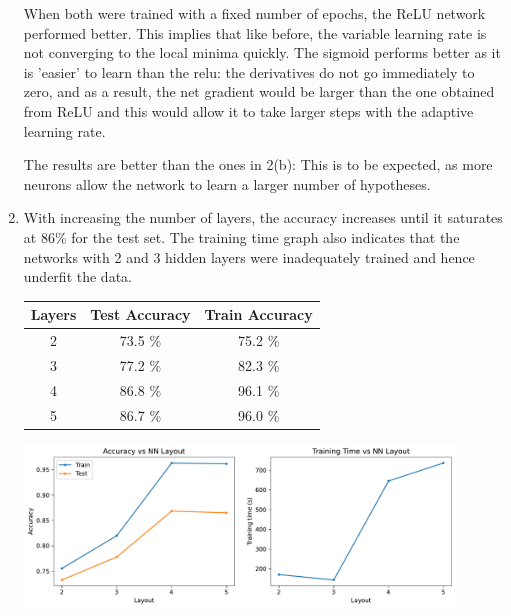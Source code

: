\documentclass[12pt]{article}
\begin{document}
\begin{enumerate}[label=(\alph*)]
    When both were trained with a fixed number of epochs, the ReLU network performed
    better. This implies that like before, the variable learning rate is not 
    converging to the local minima quickly. The sigmoid performs better as it is
    'easier' to learn than the relu: the derivatives do not go immediately to zero,
    and as a result, the net gradient would be larger than the one obtained from
    ReLU and this would allow it to take larger steps with the adaptive learning 
    rate.

    The results are better than the ones in 2(b): This is to be expected, as more
    neurons allow the network to learn a larger number of hypotheses.

    \item With increasing the number of layers, the accuracy increases until 
    it saturates at 86\% for the test set. The training time graph also indicates
    that the networks with 2 and 3 hidden layers were inadequately trained and 
    hence underfit the data. 

    \begin{center}
        \begin{tabular}{|c|c|c|}
            \hline
            Layers & Test Accuracy & Train Accuracy \\ 
            \hline 
            2 & 73.5 \% & 75.2 \% \\
            3 & 77.2 \% & 82.3 \% \\
            4 & 86.8 \% & 96.1 \% \\
            5 & 86.7 \% & 96.0 \% \\
            \hline
        \end{tabular}
    \end{center}

   \begin{center}
        \includegraphics[width=0.9\textwidth]{../Q2/mult_layer_relu/acc_time.pdf}
    \end{center}


\end{enumerate}
\end{document}
